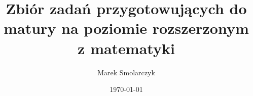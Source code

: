 \documentclass[a4paper,12pt]{book}
\begin{document}
\author{Marek Smolarczyk}
\title{Zbiór zadań przygotowujących do matury na poziomie rozszerzonym z matematyki}
\date{\today}

\frontmatter
\maketitle
\tableofcontents

\mainmatter




\backmatter
\end{document}
